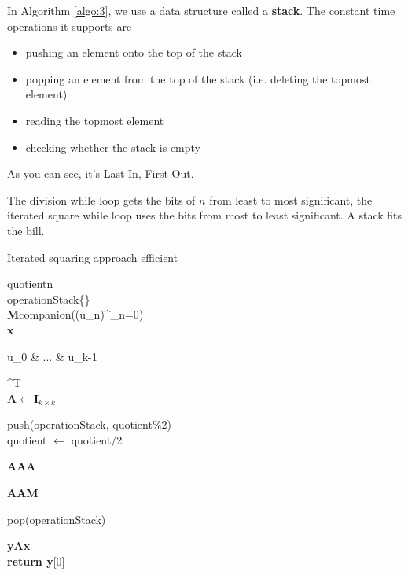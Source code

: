 \documentclass[a4paper,11pt]{article}
\numberwithin{definition}{section}
\numberwithin{mytheorem}{subsection}
\begin{document}
In Algorithm \ref{algo:3}, we use a data structure called a \textbf{stack}. The constant time operations it supports
are

\begin{itemize}
\item pushing an element onto the top of the stack
\item popping an element from the top of the stack (i.e. deleting the topmost element)
\item reading the topmost element
\item checking whether the stack is empty
\end{itemize}
As you can see, it’s Last In, First Out.

The division while loop gets the bits of $n$ from least to most significant, the iterated square while
loop uses the bits from most to least significant. A stack fits the bill.

\begin{algorithm}[ht]

\caption{Iterated squaring approach \textsf{efficient}}
\label{algo:3}
\SetAlgoLined
\DontPrintSemicolon
{}
\textsf{quotient}\longleftarrow n\\
\textsf{operationStack}\longleftarrow \{\}\\
\textbf{M}\longleftarrow \textsf{companion}((u_n)^\infty_{n=0})\\
\textbf{x}\longleftarrow \begin{bmatrix} u_0 & ... & u_{k-1} \end{bmatrix}^{T}\\
\textbf{A}$\longleftarrow$$\textbf{I}_{k\times k}$\\



{
    \textsf{push(operationStack, quotient\%2)\\
    quotient $\longleftarrow$ quotient/2}

}
\EndWhile

{
    \textbf{A}\longleftarrow\textbf{A}\cdot\textbf{A}\\
    {
                {
                    \textbf{A}\longleftarrow\textbf{A}\cdot\textbf{M}\\
                }
           \EndIf
        
     }
    \textsf{pop(operationStack)}
}       

\EndWhile

\textbf{y}\longleftarrow\textbf{Ax}\\
\textbf{return y}[0] 

\end{algorithm}
\end{document}
